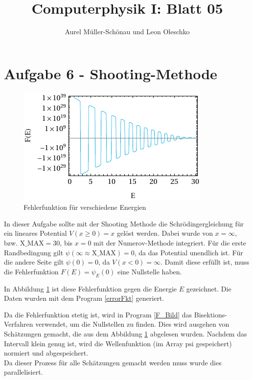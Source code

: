 


\setcounter{secnumdepth}{0}



\title{Computerphysik I: Blatt 05}
\author{Aurel Müller-Schönau und Leon Oleschko}
\maketitle

\section{Aufgabe 6 - Shooting-Methode}
\begin{figure}[h!]
	\centering
	\includegraphics[scale = 1.388888888]{img/errorFunction.pdf}
	\caption{Fehlerfunktion für verschiedene Energien}
	\label{fig:shooting}
\end{figure}
In dieser Aufgabe sollte mit der Shooting Methode die Schrödingergleichung für ein lineares Potential $V(x\geq 0)=x$ gelöst werden. 
Dabei wurde von $x=\infty$, bzw. $\text{X\_MAX}=30$, bis $x=0$ mit der Numerov-Methode integriert.
Für die erste Randbedingung gilt $\psi(\infty\approx\text{X\_MAX})=0$, da das Potential unendlich ist.
Für die andere Seite gilt $\psi(0)=0$, da $V(x<0)=\infty$.
Damit diese erfüllt ist, muss die Fehlerfunktion $F(E) = \psi_E(0)$ eine Nullstelle haben.

In Abbildung \ref{fig:shooting} ist diese Fehlerfunktion gegen die Energie $E$ gezeichnet.
Die Daten wurden mit dem Program \ref{errorFkt} generiert.
\clearpage

Da die Fehlerfunktion stetig ist, wird in Program \ref{F_Bild} das Bisektions-Verfahren verwendet, um die Nullstellen zu finden.
Dies wird ausgehen von Schätzungen gemacht, die aus dem Abbildung \ref{fig:shooting} abgelesen wurden.
Nachdem das Intervall klein genug ist, wird die Wellenfunktion (im Array $\text{psi}$ gespeichert) normiert und abgespeichert.\\
Da dieser Prozess für alle Schätzungen gemacht werden muss wurde dies parallelisiert.

